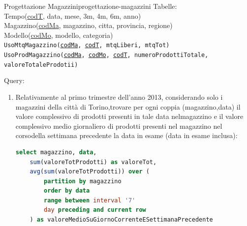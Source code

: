 \documentclass[12pt]{article}
\begin{document}
\begin{problem}{Progettazione Magazzini}{progettazione-magazzini}
    Tabelle: \\
    Tempo(\underline{codT}, data, mese, 3m, 4m, 6m, anno) \\
    Magazzino(\underline{codMa}, magazzino, citta, provincia, regione) \\
    Modello(\underline{codMo}, modello, categoria) \\
    \texttt{UsoMtqMagazzino(\underline{codMa}, \underline{codT}, mtqLiberi, mtqTot) \\
    UsoProdMagazzino(\underline{codMa}, \underline{codMo}, \underline{codT}, numeroProdottiTotale, valoreTotaleProdotii) }

    Query:
    \begin{enumerate}
        \item Relativamente al primo trimestre dell’anno 2013, considerando solo i magazzini della città di Torino,trovare per ogni coppia (magazzino,data) il valore complessivo di prodotti presenti in tale data nelmagazzino e il valore complessivo medio giornaliero di prodotti presenti nel magazzino nel corsodella settimana precedente la data in esame (data in esame inclusa):
\begin{lstlisting}[language=sql]
select magazzino, data,
    sum(valoreTotProdotti) as valoreTot,
    avg(sum(valoreTotProdotti)) over (
        partition by magazzino
        order by data
        range between interval '7'
        day preceding and current row
    ) as valoreMedioSuGiornoCorrenteESettimanaPrecedente


\end{lstlisting}
\end{enumerate}
\end{problem}
\end{document}

